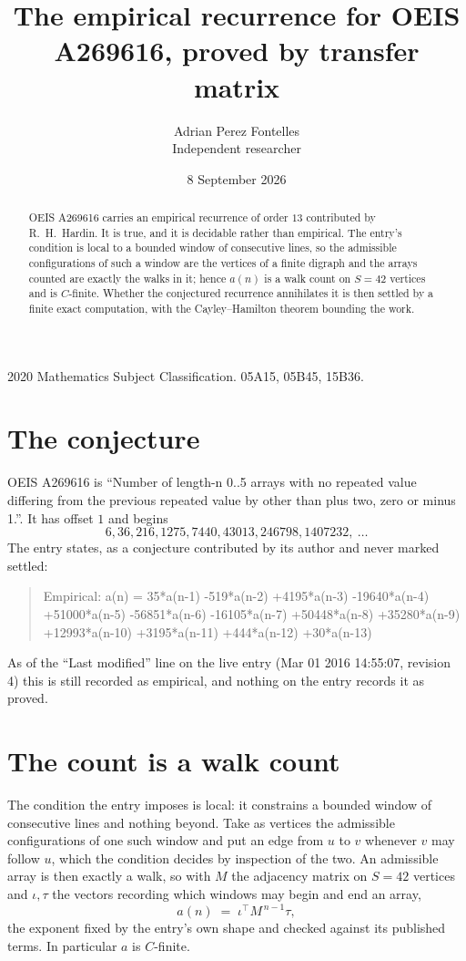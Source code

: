 \documentclass[11pt,a4paper]{article}
\title{The empirical recurrence for OEIS A269616, proved by transfer matrix}
\author{Adrian Perez Fontelles\\ \small Independent researcher}
\date{8 September 2026}
\theoremstyle{plain}
\theoremstyle{definition}
\begin{document}
\maketitle

\begin{abstract}
OEIS A269616 carries an empirical recurrence of order $13$ contributed by R.~H.~Hardin. It is
true, and it is decidable rather than empirical. The entry's condition is local to a bounded window of consecutive lines, so
the admissible configurations of such a window are the vertices of a finite digraph and the
arrays counted are exactly the walks in it; hence $a(n)$ is a walk count on $S=42$ vertices
and is $C$-finite. Whether the conjectured recurrence annihilates it is then settled by a
finite exact computation, with the Cayley--Hamilton theorem bounding the work.
\end{abstract}

\noindent\small 2020 Mathematics Subject Classification. 05A15, 05B45, 15B36.\normalsize

\section{The conjecture}

OEIS A269616 is ``Number of length-n 0..5 arrays with no repeated value differing from the previous repeated value by other than plus two, zero or minus 1.''. It has offset $1$ and begins
\[
6, 36, 216, 1275, 7440, 43013, 246798, 1407232,\ \dots
\]
The entry states, as a conjecture contributed by its author and never marked settled:
\begin{quote}
Empirical: a(n) = 35*a(n-1) -519*a(n-2) +4195*a(n-3) -19640*a(n-4) +51000*a(n-5) -56851*a(n-6) -16105*a(n-7) +50448*a(n-8) +35280*a(n-9) +12993*a(n-10) +3195*a(n-11) +444*a(n-12) +30*a(n-13)
\end{quote}
As of the ``Last modified'' line on the live entry (Mar 01 2016 14:55:07, revision 4) this is still
recorded as empirical, and nothing on the entry records it as proved.

\section{The count is a walk count}

The condition the entry imposes is local: it constrains a bounded window of consecutive lines and nothing beyond. Take as
vertices the admissible configurations of one such window and put an edge from $u$ to $v$
whenever $v$ may follow $u$, which the condition decides by inspection of the two. An
admissible array is then exactly a walk, so with $M$ the adjacency matrix on $S=42$ vertices
and $\iota,\tau$ the vectors recording which windows may begin and end an array,
\[
a(n)\;=\;\iota^{\!\top}M^{\,n-1}\tau ,
\]
the exponent fixed by the entry's own shape and checked against its published terms. In
particular $a$ is $C$-finite.
\end{document}
